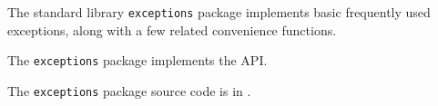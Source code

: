 
The standard library {\tt exceptions} package implements basic frequently used exceptions, 
along with a few related convenience functions.

The {\tt exceptions} package implements the  API.

The {\tt exceptions} package source code is in .






